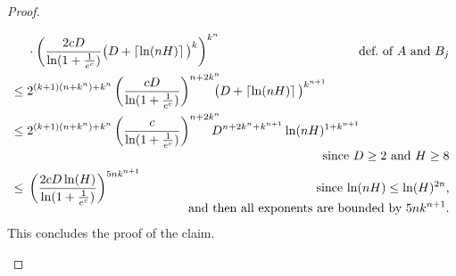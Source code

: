 \begin{proof}
\begin{claimproof}
\begin{align*}
              & \cdot
                \left(\frac{2cD}{\ln(1 + \frac{1}{e^c})} 
                \big(D + \ceil{\ln(n H)} \big)^k\right)^{k^n}
              &\hspace{-0.7cm}\text{def.~of $A$ and $B_j$}
              \\
              \leq{}&  
              2^{(k+1)(n+k^n)+k^n}\left(\frac{cD}{\ln(1 + \frac{1}{e^c})}\right)^{n+2k^n} \hspace{-7pt}\big(D + \ceil{\ln(n H)} \big)^{k^{n+1}}\\
              \leq{}& 
              2^{(k+1)(n+k^n)+k^n}\left(\frac{c}{\ln(1 + \frac{1}{e^c})}\right)^{n+2k^n} \hspace{-9pt} D^{n+2k^n+k^{n+1}}\ln(n H)^{1+k^{n+1}}
              \\[-3pt]
              &&\hspace{-1.4cm}\text{since $D \geq 2$ and $H \geq 8$}\\
              \leq{}& 
              \left(\frac{2cD\ln(H)}{\ln(1 + \frac{1}{e^c})}\right)^{5nk^{n+1}} 
              &
              \hspace{-1.6cm}\text{since $\ln(nH) \leq \ln(H)^{2n}$,}\\[-7pt]
              &&\hspace{-5.5cm}\text{and then all exponents are bounded by $5nk^{n+1}$.}
          \end{align*}
          This concludes the proof of the claim.
        \end{claimproof}
  

\end{proof}

